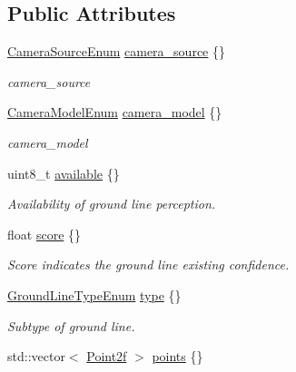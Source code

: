 \subsection*{Public Attributes}
\begin{DoxyCompactItemize}
\item 
\hyperlink{structmaf__perception__interface_1_1CameraSourceEnum}{Camera\+Source\+Enum} \hyperlink{structmaf__perception__interface_1_1GroundLine_a9752c396f2921461b46ed33e04536958}{camera\+\_\+source} \{\}
\begin{DoxyCompactList}\small\item\em camera\+\_\+source \end{DoxyCompactList}\item 
\hyperlink{structmaf__perception__interface_1_1CameraModelEnum}{Camera\+Model\+Enum} \hyperlink{structmaf__perception__interface_1_1GroundLine_ad914418cfe2504ecc91c20326fc5560a}{camera\+\_\+model} \{\}
\begin{DoxyCompactList}\small\item\em camera\+\_\+model \end{DoxyCompactList}\item 
uint8\+\_\+t \hyperlink{structmaf__perception__interface_1_1GroundLine_abfd58567c9045d0e57056f62e4f21040}{available} \{\}
\begin{DoxyCompactList}\small\item\em Availability of ground line perception. \end{DoxyCompactList}\item 
float \hyperlink{structmaf__perception__interface_1_1GroundLine_a2ae2c5f4b0dd669de6225478eb4f5006}{score} \{\}
\begin{DoxyCompactList}\small\item\em Score indicates the ground line existing confidence. \end{DoxyCompactList}\item 
\hyperlink{structmaf__perception__interface_1_1GroundLineTypeEnum}{Ground\+Line\+Type\+Enum} \hyperlink{structmaf__perception__interface_1_1GroundLine_a1c29c46eaad71b036c40cd5dbfe483c6}{type} \{\}
\begin{DoxyCompactList}\small\item\em Subtype of ground line. \end{DoxyCompactList}\item 
std\+::vector$<$ \hyperlink{structmaf__perception__interface_1_1Point2f}{Point2f} $>$ \hyperlink{structmaf__perception__interface_1_1GroundLine_aca2cb87888547afc660b10c0da59d397}{points} \{\}

\end{DoxyCompactItemize}
